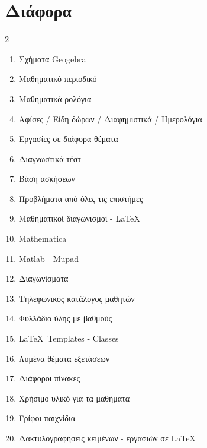\documentclass[11pt,a4paper]{article}
\begin{document}
\section{Διάφορα}
\begin{multicols}{2}
\begin{enumerate}[label=\thesection.\arabic*]
\item Σχήματα Geogebra
\item Μαθηματικό περιοδικό
\item Μαθηματικά ρολόγια
\item Αφίσες / Είδη δώρων / Διαφημιστικά / Ημερολόγια
\item Εργασίες σε διάφορα θέματα
\item Διαγνωστικά τέστ
\item Βάση ασκήσεων
\item Προβλήματα από όλες τις επιστήμες
\item Μαθηματικοί διαγωνισμοί - LaTeX
\item Mathematica
\item Matlab - Mupad
\item Διαγωνίσματα
\item Τηλεφωνικός κατάλογος μαθητών
\item Φυλλάδιο ύλης με βαθμούς
\item \LaTeX\ Templates - Classes
\item Λυμένα θέματα εξετάσεων
\item Διάφοροι πίνακες
\item Χρήσιμο υλικό για τα μαθήματα
\item Γρίφοι παιχνίδια
\item Δακτυλογραφήσεις κειμένων - εργασιών σε \LaTeX
\end{enumerate}
\end{multicols}
\end{document}

